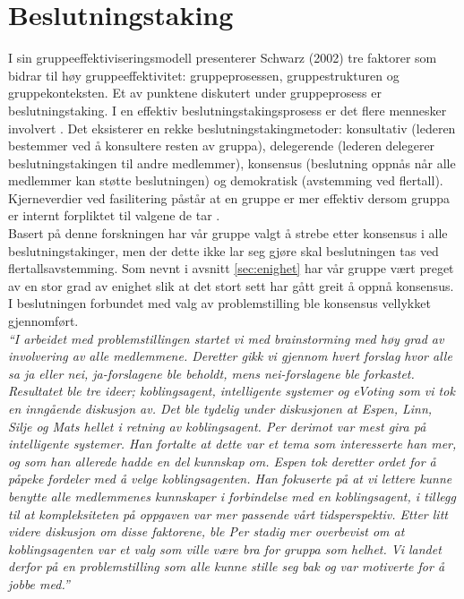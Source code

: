 \section{Beslutningstaking}
\label{sec:beslutningstaking}
I sin gruppeeffektiviseringsmodell presenterer Schwarz (2002) tre faktorer som bidrar til høy gruppeeffektivitet: gruppeprosessen, gruppestrukturen og gruppekonteksten. Et av punktene diskutert under gruppeprosess er beslutningstaking. I en effektiv beslutningstakingsprosess er det flere mennesker involvert . Det eksisterer en rekke beslutningstakingmetoder: konsultativ (lederen bestemmer  ved å konsultere resten av gruppa), delegerende (lederen delegerer beslutningstakingen til andre medlemmer), konsensus (beslutning oppnås når alle medlemmer kan støtte beslutningen) og demokratisk (avstemming ved flertall). Kjerneverdier ved fasilitering påstår at en gruppe er mer effektiv dersom gruppa er internt forpliktet til valgene de tar \citep{fasilitator}.\\

Basert på denne forskningen har vår gruppe valgt å strebe etter konsensus i alle beslutningstakinger, men der dette ikke lar seg gjøre skal beslutningen tas ved flertallsavstemming. Som nevnt i avsnitt \ref{sec:enighet} har vår gruppe vært preget av en stor grad av enighet slik at det stort sett har gått greit å oppnå konsensus. I beslutningen forbundet med valg av problemstilling ble konsensus vellykket gjennomført.\\

\textit{``I arbeidet med problemstillingen startet vi med brainstorming med høy grad av involvering av alle medlemmene. Deretter gikk vi gjennom hvert forslag hvor alle sa ja eller nei, ja-forslagene ble beholdt, mens nei-forslagene ble forkastet. Resultatet ble tre ideer; koblingsagent, intelligente systemer og eVoting som vi tok en inngående diskusjon av. Det ble tydelig under diskusjonen at Espen, Linn, Silje og Mats hellet i retning av koblingsagent. Per derimot var mest gira på intelligente systemer. Han fortalte at dette var et tema som interesserte han mer, og som han allerede hadde en del kunnskap om. Espen tok deretter ordet for å påpeke fordeler med å velge koblingsagenten. Han fokuserte på at vi lettere kunne benytte alle medlemmenes kunnskaper i forbindelse med en koblingsagent, i tillegg til at kompleksiteten på oppgaven var mer passende vårt tidsperspektiv. Etter litt videre diskusjon om disse faktorene, ble Per stadig mer overbevist om at koblingsagenten var et valg som ville være bra for gruppa som helhet. Vi landet derfor på en problemstilling som alle kunne stille seg bak og var motiverte for å jobbe med.''}\\

